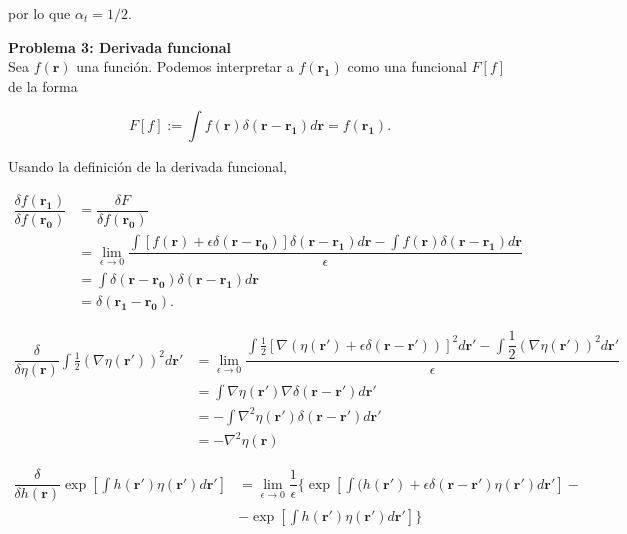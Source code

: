 \documentclass[10pt]{article}
\begin{document}
por lo que $\alpha_t = 1/2$.

\pagebreak

\textbf{Problema 3: Derivada funcional}\\

Sea $f(\mathbf{r})$ una funci\'on. Podemos interpretar a $f(\mathbf{r_1})$ como una funcional $F[f]$ de la forma

\begin{equation}
F[f] := \int f(\mathbf{r}) \delta(\mathbf{r} - \mathbf{r_1}) d \mathbf{r} = f(\mathbf{r_1}).
\end{equation}

Usando la definici\'on de la derivada funcional,

\begin{align*}
\dfrac{\delta f(\mathbf{r_1})}{\delta f(\mathbf{r_0})} &= \dfrac{\delta F}{\delta f(\mathbf{r_0})} \\
&= \lim_{\epsilon\rightarrow 0} \dfrac{\int \left[ f(\mathbf{r}) + \epsilon \delta(\mathbf{r} - \mathbf{r_0})\right] \delta(\mathbf{r} - \mathbf{r_1}) d \mathbf{r} - \int f(\mathbf{r}) \delta(\mathbf{r} - \mathbf{r_1}) d \mathbf{r}}{\epsilon} \\
&= \int \delta(\mathbf{r} - \mathbf{r_0}) \delta(\mathbf{r} - \mathbf{r_1}) d \mathbf{r} \\
&=  \delta(\mathbf{r_1} - \mathbf{r_0}).
\end{align*}

\begin{align*}
\dfrac{\delta}{\delta \eta(\mathbf{r})}\int \frac{1}{2} \left(\nabla \eta(\mathbf{r'})\right)^2 d\mathbf{r'} &= \lim_{\epsilon \rightarrow 0} \dfrac{ \int \frac{1}{2} \left[\nabla \left(\eta(\mathbf{r'}) + \epsilon \delta(\mathbf{r}-\mathbf{r'})\right)\right]^2 d\mathbf{r'} - \int \dfrac{1}{2} \left(\nabla \eta(\mathbf{r'})\right)^2 d\mathbf{r'} }{\epsilon} \\
&=   \int \nabla \eta(\mathbf{r'})\nabla  \delta(\mathbf{r}-\mathbf{r'}) d\mathbf{r'} \\
&= - \int \nabla^2 \eta(\mathbf{r'}) \delta(\mathbf{r}-\mathbf{r'}) d\mathbf{r'} \\
&= -\nabla^2 \eta(\mathbf{r})
\end{align*}

\begin{align*}
\dfrac{\delta}{\delta h(\mathbf{r})} \exp\left[\int h(\mathbf{r'})\eta(\mathbf{r'}) d\mathbf{r'}\right] &= \lim_{\epsilon\rightarrow 0} \dfrac{1}{\epsilon}\bigg\lbrace 
\exp\left[\int (h(\mathbf{r'}) + \epsilon \delta(\mathbf{r}-\mathbf{r'}) \eta(\mathbf{r'}) d\mathbf{r'}\right] - \\
&-\exp\left[\int h(\mathbf{r'})\eta(\mathbf{r'}) d\mathbf{r'}\right] \bigg\rbrace
\end{align*}
\end{document}
